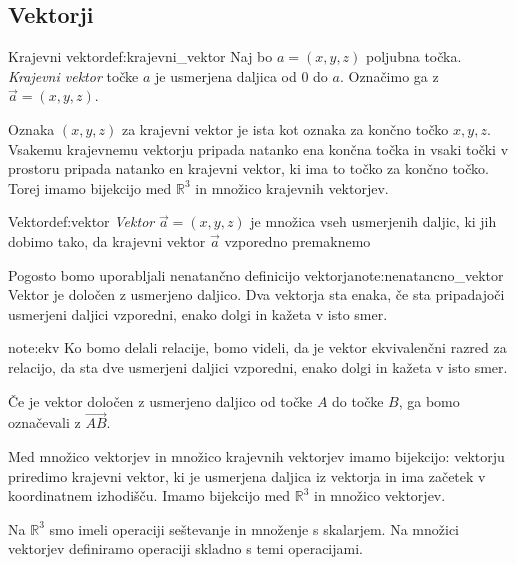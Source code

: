\documentclass[a4,12pt]{article}
\newcommand{\R}{\mathbb{R}}
\begin{document}
\subsection{Vektorji}
    \begin{definition}{Krajevni vektor}{def:krajevni_vektor}
        Naj bo \(a = \left(x, y, z\right)\) poljubna točka. \emph{Krajevni vektor} točke \(a\) je usmerjena daljica od \(0\) do \(a\).
        Označimo ga z \(\vec{a} = \left(x, y, z\right)\).

        Oznaka \(\left(x, y, z\right)\) za krajevni vektor je ista kot oznaka za končno točko \(x, y, z\).
        Vsakemu krajevnemu vektorju pripada natanko ena končna točka in vsaki točki v prostoru pripada natanko en krajevni vektor, ki
        ima to točko za končno točko. Torej imamo bijekcijo med \(\R^3\) in množico krajevnih vektorjev.
    \end{definition}
    \begin{definition}{Vektor}{def:vektor}
        \emph{Vektor} \(\vec{a} = \left(x, y, z\right)\) je množica vseh usmerjenih daljic, ki jih dobimo tako, da krajevni vektor \(\vec{a}\)
        vzporedno premaknemo
    \end{definition}
    \begin{note}{Pogosto bomo uporabljali nenatančno definicijo vektorja}{note:nenatancno_vektor}
        Vektor je določen z usmerjeno daljico. Dva vektorja sta enaka, če sta pripadajoči usmerjeni daljici
        vzporedni, enako dolgi in kažeta v isto smer.
    \end{note}
    \begin{note}{}{note:ekv}
        Ko bomo delali relacije, bomo videli, da je vektor ekvivalenčni razred za
        relacijo, da sta dve usmerjeni daljici vzporedni, enako dolgi in kažeta v isto smer.
    \end{note}

    \noindent Če je vektor določen z usmerjeno daljico od točke \(A\) do točke \(B\), ga bomo označevali z \(\overrightarrow{AB}\).

    Med množico vektorjev in množico krajevnih vektorjev imamo bijekcijo: vektorju priredimo krajevni vektor, ki je usmerjena daljica
    iz vektorja in ima začetek v koordinatnem izhodišču. Imamo bijekcijo med \(\R^3\) in množico vektorjev.

    Na \(\R^3\) smo imeli operaciji seštevanje in množenje s skalarjem. Na množici vektorjev definiramo operaciji skladno s temi operacijami.
\end{document}
